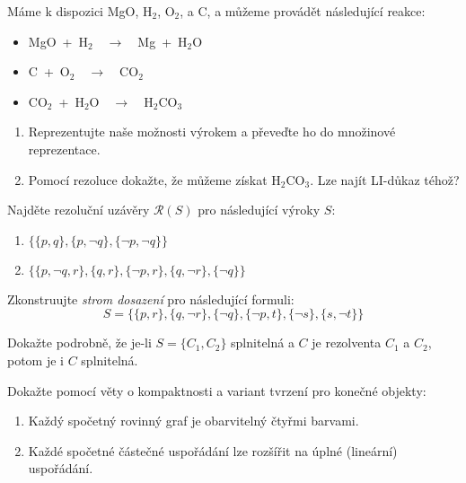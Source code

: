 \documentclass[a4paper,12pt]{article}
\begin{document}
    
    \medskip\begin{problem} Máme k dispozici MgO, H$_2$, O$_2$, a C, a můžeme provádět následující reakce:
        \begin{itemize}
            \item MgO\ +\ H$_2$\ \ $\to$\ \ Mg\ +\ H$_2$O
            \item C\ +\ O$_2$\ \ $\to$\ \ CO$_2$
            \item CO$_2$\ +\ H$_2$O\ \ $\to$\ \ H$_2$CO$_3$
        \end{itemize}
        \begin{enumerate}
            \item Reprezentujte naše možnosti výrokem %
            a převeďte ho do množinové reprezentace.
            \item Pomocí rezoluce dokažte, že můžeme získat H$_2$CO$_3$. Lze najít LI-důkaz téhož?
        \end{enumerate}
    \end{problem}
    
    
    \medskip\begin{problem}
        Najděte rezoluční uzávěry $\mathcal{R}(S)$ pro následující výroky $S$:
        \begin{enumerate}
            \item $\{\{p,q\},\{p,\neg q\},\{\neg p,\neg q\}\}$
            \item $\{\{p,\neg q,r\},\{q,r\},\{\neg p, r\},\{q,\neg r\},\{\neg q\}\}$
        \end{enumerate}
    \end{problem}
        
        
    \medskip\begin{problem}
        Zkonstruujte \emph{strom dosazení} pro následující formuli: 
        $$
        S=\{\{p,r\},\{q,\neg r\},\{\neg q\},\{\neg p,t\},\{\neg s\},\{s,\neg t\}\}
        $$
    \end{problem}
    
    
    \medskip\begin{problem}
        Dokažte podrobně, že je-li $S=\{C_1,C_2\}$ splnitelná a $C$ je rezolventa $C_1$ a $C_2$, potom je i $C$ splnitelná.
    \end{problem}
    
        
    \medskip\begin{problem} Dokažte pomocí věty o kompaktnosti a variant tvrzení pro konečné objekty:
    \begin{enumerate}
        \item Každý spočetný rovinný graf je obarvitelný čtyřmi barvami.
        \item Každé spočetné částečné uspořádání lze rozšířit na úplné (lineární) uspořádání.
    \end{enumerate}
    
    \end{problem}
        
\end{document}

